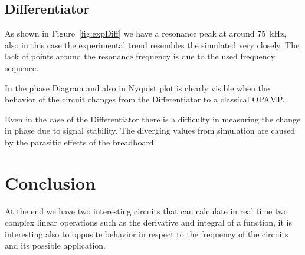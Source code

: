 \documentclass[a4paper, twocolumn]{article}
\begin{document}
\subsection{Differentiator}

As shown in Figure~\ref{fig:expDiff} we have a resonance peak at around \SI{75}{\kilo\hertz}, also in this case the experimental trend resembles the simulated very closely. The lack of points around the resonance frequency is due to the used frequency sequence.

In the phase Diagram and also in Nyquist plot is clearly visible when the behavior of the circuit changes from the Differentiator to a classical OPAMP. 

Even in the case of the Differentiator there is a difficulty in measuring the change in phase due to signal stability. The diverging values from simulation are caused by the parasitic effects of the breadboard. 

\section{Conclusion}

At the end we have two interesting circuits that can calculate in real time two complex linear operations such as the derivative and integral of a function, it is interesting also to opposite behavior in respect to the frequency of the circuits and its possible application.  
\end{document}
